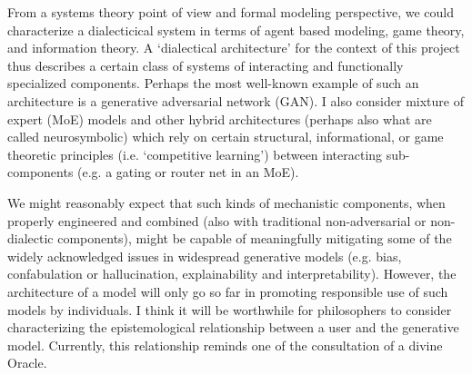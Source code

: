 \documentclass[11pt, oneside]{article}   	%
\begin{document}






From a systems theory point of view and formal modeling perspective, we could characterize a dialecticical system in terms of agent based modeling, game theory, and information theory.  A `dialectical architecture' for the context of this project thus describes a certain class of systems of interacting and functionally specialized components.  Perhaps the most well-known example of such an architecture is a generative adversarial network (GAN).  I also consider mixture of expert (MoE) models and other hybrid architectures (perhaps also what are called neurosymbolic) which rely on certain structural, informational, or game theoretic principles (i.e. `competitive learning') between interacting sub-components (e.g. a gating or router net in an MoE).  \citep{MixtureExperts1991}  

We might reasonably expect that such kinds of mechanistic components, when properly engineered and combined (also with traditional non-adversarial or non-dialectic components), might be capable of meaningfully mitigating some of the widely acknowledged issues in widespread generative models (e.g. bias, confabulation or hallucination, explainability and interpretability).  However, the architecture of a model will only go so far in promoting responsible use of such models by individuals.  I think it will be worthwhile for philosophers to consider characterizing the epistemological relationship between a user and the generative model.  Currently, this relationship reminds  one of the consultation of a divine Oracle. 


\end{document}
